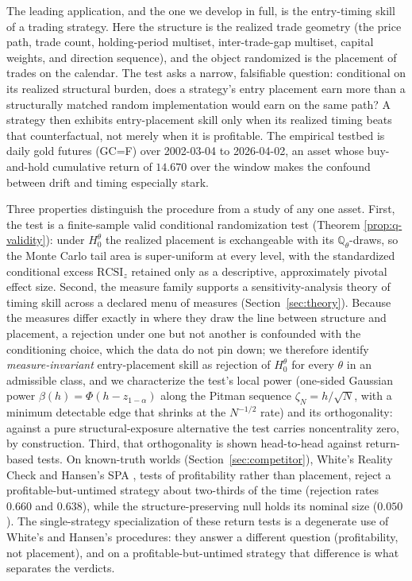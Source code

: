 \documentclass[risks,article,submit,pdftex,oneauthor]{Definitions/mdpi}
\begin{document}
The leading application, and the one we develop in full, is the entry-timing skill of a
trading strategy. Here the structure is the realized trade geometry (the price path,
trade count, holding-period multiset, inter-trade-gap multiset, capital weights, and
direction sequence), and the object randomized is the placement of trades on the
calendar. The test asks a narrow, falsifiable question: conditional on its realized
structural burden, does a strategy's entry placement earn more than a structurally
matched random implementation would earn on the same path? A strategy then exhibits
entry-placement skill only when its realized timing beats that counterfactual, not
merely when it is profitable. The empirical testbed is daily gold futures (GC=F) over
2002-03-04 to 2026-04-02, an asset whose buy-and-hold cumulative return of $14.670$ over
the window makes the confound between drift and timing especially stark.

Three properties distinguish the procedure from a study of any one asset. First,
the test is a finite-sample valid conditional randomization test (Theorem
\ref{prop:q-validity}): under $H_0^\theta$ the realized placement is exchangeable with
its $\mathbb{Q}_\theta$-draws, so the Monte Carlo tail area is super-uniform at every
level, with the standardized conditional excess $\mathrm{RCSI}_z$ retained only as a
descriptive, approximately pivotal effect size. Second, the measure family supports a
sensitivity-analysis theory of timing skill across a declared menu of measures
(Section~\ref{sec:theory}). Because the
measures differ exactly in where they draw the line between structure and placement, a
rejection under one but not another is confounded with the conditioning choice, which
the data do not pin down; we therefore identify \emph{measure-invariant} entry-placement
skill as rejection of $H_0^\theta$ for every $\theta$ in an admissible class, and we
characterize the test's local power (one-sided Gaussian power
$\beta(h)=\Phi(h-z_{1-\alpha})$ along the Pitman sequence $\zeta_N=h/\sqrt N$, with a
minimum detectable edge that shrinks at the $N^{-1/2}$ rate) and its orthogonality:
against a pure structural-exposure alternative the test carries noncentrality zero, by
construction. Third, that orthogonality is shown head-to-head against return-based
tests. On known-truth worlds (Section~\ref{sec:competitor}), White's Reality Check
\citep{white2000} and Hansen's SPA \citep{hansen2005}, tests of profitability rather than
placement, reject a profitable-but-untimed strategy about two-thirds of the time
(rejection rates $0.660$ and $0.638$), while the structure-preserving null holds its
nominal size ($0.050$). The single-strategy specialization of these return tests is a
degenerate use of White's and Hansen's procedures: they answer a different question
(profitability, not placement), and on a profitable-but-untimed strategy that
difference is what separates the verdicts.
\end{document}
